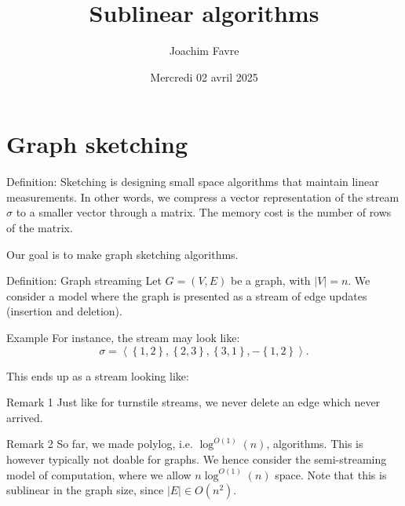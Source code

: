 \documentclass[a4paper]{article}
\title{Sublinear algorithms}
\author{Joachim Favre}
\date{Mercredi 02 avril 2025}
\begin{document}
\maketitle


\section{Graph sketching}

\begin{parag}{Definition: Sketching}
     is designing small space algorithms that maintain linear measurements. In other words, we compress a vector representation of the stream $\sigma$ to a smaller vector through a matrix. The memory cost is the number of rows of the matrix.

    Our goal is to make graph sketching algorithms.
\end{parag}

\begin{parag}{Definition: Graph streaming}
    Let $G = \left(V, E\right)$ be a graph, with $\left|V\right| = n$. We consider a model where the graph is presented as a stream of edge updates (insertion and deletion).

    \begin{subparag}{Example}
        For instance, the stream may look like: 
        \[\sigma = \left\langle \left\{1, 2\right\}, \left\{2, 3\right\}, \left\{3, 1\right\}, -\left\{1, 2\right\} \right\rangle.\]

        This ends up as a stream looking like:
    \end{subparag}

    \begin{subparag}{Remark 1}
        Just like for turnstile streams, we never delete an edge which never arrived.
    \end{subparag}

    \begin{subparag}{Remark 2}
        So far, we made polylog, i.e. $\log^{O\left(1\right)}\left(n\right)$, algorithms. This is however typically not doable for graphs. We hence consider the semi-streaming model of computation, where we allow $n \log^{O\left(1\right)}\left(n\right)$ space. Note that this is sublinear in the graph size, since $\left|E\right| \in O\left(n^2\right)$.
    \end{subparag}
\end{parag}
\end{document}
